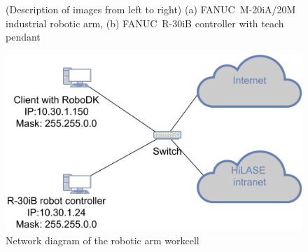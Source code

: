 \begin{figure}[H]
\begin{center}
  \hspace{1cm}
  \caption[FANUC~M-20iA/20M industrial robotic arm and FANUC R-30iB controller]
    {(Description of images from left to right) (a) FANUC~M-20iA/20M industrial robotic arm, (b) FANUC~R-30iB controller with teach pendant~\cite{fanucrobotcontroller}}
  \label{fig:fanucrobot}
\end{center}
\end{figure}




\begin{figure}[t!]
    \centering
    \includegraphics[width=0.8\linewidth]{img/network.pdf}
    \caption{Network diagram of the robotic arm workcell}
    \label{fig:network}
\end{figure}

\null








